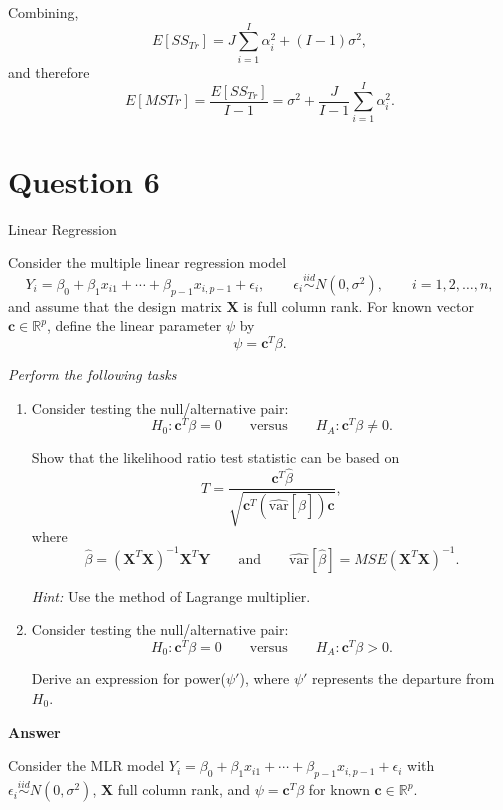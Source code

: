 \documentclass[letterpaper]{article}
\begin{document}
			Combining,
			\[
			E[SS_{Tr}]
			= J\sum_{i=1}^I \alpha_i^2 + (I-1)\sigma^2,
			\]
			and therefore
			\[
			E[MSTr]
			= \frac{E[SS_{Tr}]}{I-1}
			= \sigma^2 + \frac{J}{I-1}\sum_{i=1}^I \alpha_i^2. 
			\]
			
		
		\clearpage
		
		\section{Question 6}
		
		{\color{deepred}   Linear Regression}
		
		Consider the multiple linear regression model
		\begin{equation}
			Y_i=\beta_0+\beta_1 x_{i1}+\cdots+\beta_{p-1}x_{i,p-1}+\epsilon_i,
			\qquad
			\epsilon_i\overset{iid}{\sim}N(0,\sigma^2),
			\qquad
			i=1,2,\ldots,n,
		\end{equation}
		and assume that the design matrix $\mathbf{X}$ is full column rank. For known vector $\mathbf{c}\in\mathbb{R}^p$, define the linear parameter $\psi$ by
		\[
		\psi=\mathbf{c}^T\beta.
		\]
		
		\emph{Perform the following tasks}
		\begin{enumerate}
			\item[(i)] Consider testing the null/alternative pair:
			\[
			H_0:\mathbf{c}^T\beta=0
			\qquad
			\text{versus}
			\qquad
			H_A:\mathbf{c}^T\beta\neq 0.
			\]
			
			Show that the likelihood ratio test statistic can be based on
			\[
			T=\frac{\mathbf{c}^T\hat{\beta}}{\sqrt{\mathbf{c}^T(\widehat{\mathrm{var}}[\hat{\beta}])\mathbf{c}}},
			\]
			where
			\[
			\hat{\beta}=(\mathbf{X}^T\mathbf{X})^{-1}\mathbf{X}^T\mathbf{Y}
			\qquad \text{and} \qquad
			\widehat{\mathrm{var}}[\hat{\beta}]=MSE(\mathbf{X}^T\mathbf{X})^{-1}.
			\]
			
			\emph{Hint:} Use the method of Lagrange multiplier.
			
			\item[(ii)] Consider testing the null/alternative pair:
			\[
			H_0:\mathbf{c}^T\beta=0
			\qquad
			\text{versus}
			\qquad
			H_A:\mathbf{c}^T\beta>0.
			\]
			
			Derive an expression for power($\psi'$), where $\psi'$ represents the departure from $H_0$.
		\end{enumerate}
		
		\textbf{Answer}
		
		
		Consider the MLR model $Y_i = \beta_0 + \beta_1 x_{i1} + \cdots + \beta_{p-1}x_{i,p-1} + \epsilon_i$
		with $\epsilon_i \overset{iid}{\sim} N(0,\sigma^2)$, $\mathbf{X}$ full column rank, and
		$\psi = \mathbf{c}^T\beta$ for known $\mathbf{c} \in \mathbb{R}^p$.
\end{document}
